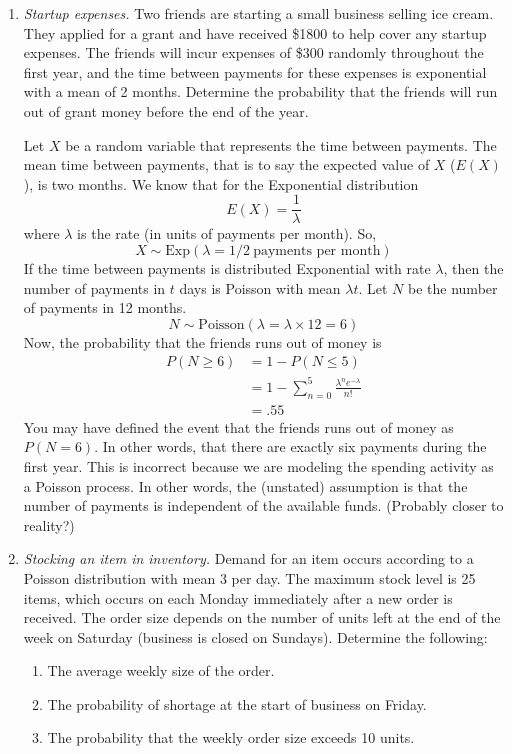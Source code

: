 \begin{enumerate}
\item \emph{Startup expenses.}
Two friends are starting a small business selling ice cream. They applied for a grant and have received \$\num{1800} to help cover any startup expenses. The friends will incur expenses of \$300 randomly throughout the first year, and the time between payments for these expenses is exponential with a mean of 2 months. Determine the probability that the friends will run out of grant money before the end of the year.

\begin{solution}
	\bs
	Let $X$ be a random variable that represents the time between
	payments. The mean time between payments, that is to say the
	expected value of $X$ ($E(X)$), is two months. We know that for
	the Exponential distribution
	\[ E(X) = \frac{1}{\lambda} \]
	where $\lambda$ is the rate (in units of payments
	per month). So,
	\[ X \sim \text{Exp}(\lambda = 1/2~\text{payments per month}) \]
	If the time between payments is distributed Exponential with
	rate $\lambda$, then the number of payments in $t$ days
	is Poisson with mean $\lambda t$. Let $N$ be the number of payments in 12 months.
	\[ N \sim \text{Poisson}(\lambda = \lambda \times 12 = 6) \]
	Now, the probability that the friends runs out of money is
	\begin{align*}
		P(N \geq 6) &= 1 - P(N \leq 5) \\
		&= 1 - \sum_{n=0}^{5} \frac{\lambda^n e^{-\lambda}}{n!}\\
		&= .55
	\end{align*}
	You may have defined the event that the friends runs out of money as
	$P(N = 6)$. In other words, that there are exactly six payments during the first year.  This is incorrect because we are modeling the spending activity as a Poisson process. In other words, the
	(unstated) assumption is that the number of payments is
	independent of the available funds. (Probably closer to reality?)
\end{solution}

\item \emph{Stocking an item in inventory.}
Demand for an item occurs according to a Poisson distribution with
mean 3 per day. The maximum stock level is 25 items, which occurs on
each Monday immediately after a new order is received. The order size
depends on the number of units left at the end of the week on Saturday
(business is closed on Sundays). Determine the following:
\begin{enumerate}
\item The average weekly size of the order. \label{ex:asize}
\item The probability of shortage at the start of business on Friday. \label{ex:pshort}
\item The probability that the weekly order size exceeds 10 units. \label{ex:pex}
\end{enumerate}


\end{enumerate}
